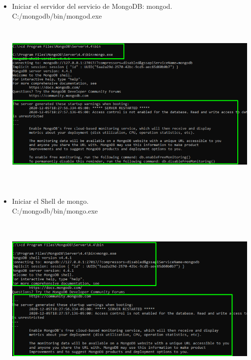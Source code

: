 \documentclass[12pt,a4paper,oneside]{book}
\begin{document}
	\newpage
\begin{itemize}
	\item {Iniciar el servidor del servicio de MongoDB: mongod. \\ C:/mongodb/bin/mongod.exe}\\
	
	\includegraphics[width=16cm, height=9cm]{img/8.png}\\
	
	\item {Iniciar el Shell de mongo.\\ 
	C:/mongodb/bin/mongo.exe}\\
	
	\includegraphics[width=16cm, height=9cm]{img/9.png}\\
	
	
\end{itemize}
\end{document}
